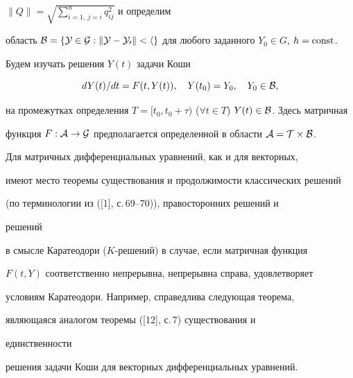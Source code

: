 $\|Q\|=\sqrt{\sum\limits^n_{i=1,\ j=i}q^2_{ij}}$ и определим 


область $\cal B=\{Y\in G:\|Y-Y_0\|<h\}$ для любого заданного $Y_0\in 


G$, $h=\const$. 


 


Будем изучать решения $Y(t)$ задачи Коши 


\begin{equation} 


d Y(t)/d t=F(t,Y(t)),\quad 


Y(t_0)=Y_0,\quad Y_0\in\cal B,


\end{equation} 


на промежутках определения $T=[t_0,t_0+\tau)$ ($\forall t\in 


T$) $Y(t)\in\cal B$. Здесь матричная 


функция $F:\cal A\to G$ предполагается определенной в области $\cal 


A=T\times\cal B$. 


 


Для матричных дифференциальных уравнений, как и для векторных, 


имеют место теоремы существования и продолжимости классических решений 


(по терминологии из ([1], с.\,69--70)), правосторонних решений и 


решений 


в смысле Каратеодори ($K$-решений) в случае, если матричная функция 


$F(t,Y)$ соответственно непрерывна, непрерывна справа, удовлетворяет 


условиям Каратеодори. Например, справедлива следующая теорема, 


являющаяся аналогом теоремы ([12], с.\,7) существования и 


единственности 


решения задачи Коши для векторных дифференциальных уравнений. 


 


